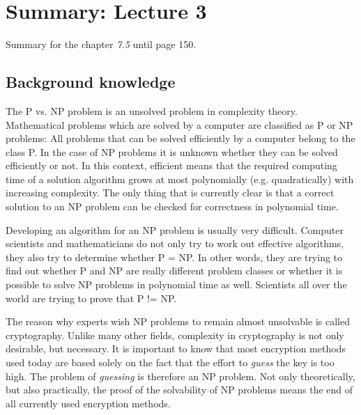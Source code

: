 \documentclass[a4]{scrartcl}
\begin{document}




\section*{Summary: Lecture 3}

Summary for the chapter \textit{7.5} until page 150. \cite{CC, book}




\subsection*{Background knowledge}

The P vs. NP problem is an unsolved problem in complexity theory.
Mathematical problems which are solved by a computer are classified as P or NP problems: All problems that can be solved efficiently by a computer belong to the class P. In the case of NP problems it is unknown whether they can be solved efficiently or not. In this context, efficient means that the required computing time of a solution algorithm grows at most polynomially (e.g. quadratically) with increasing complexity. The only thing that is currently clear is that a correct solution to an NP problem can be checked for correctness in polynomial time. 

Developing an algorithm for an NP problem is usually very difficult. Computer scientists and mathematicians do not only try to work out effective algorithms, they also try to determine whether P = NP. In other words, they are trying to find out whether P and NP are really different problem classes or whether it is possible to solve NP problems in polynomial time as well. Scientists all over the world are trying to prove that P != NP. 

The reason why experts wish NP problems to remain almost unsolvable is called cryptography. Unlike many other fields, complexity in cryptography is not only desirable, but necessary. It is important to know that most encryption methods used today are based solely on the fact that the effort to \textit{guess} the key is too high. The problem of \textit{guessing} is therefore an NP problem. Not only theoretically, but also practically, the proof of the solvability of NP problems means the end of all currently used encryption methods.
\end{document}
